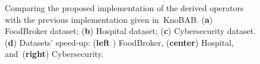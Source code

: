 \documentclass[information,article,accept,pdftex,oneauthor]{Definitions/mdpi}
\begin{document}
\begin{figure}[H]








\caption{{Comparing} %
 the proposed implementation of the derived operators with the previous implementation given in~KnoBAB. (\textbf{a}) FoodBroker dataset; (\textbf{b}) Hospital dataset;  (\textbf{c}) Cybersecurity dataset. (\textbf{d}) Datasets' speed-up: (\textbf{{left}%
}) FoodBroker, (\textbf{{center}}) Hospital, and~(\textbf{{right}}) Cybersecurity.}\label{overallBenchmarks}
\end{figure}
\end{document}
